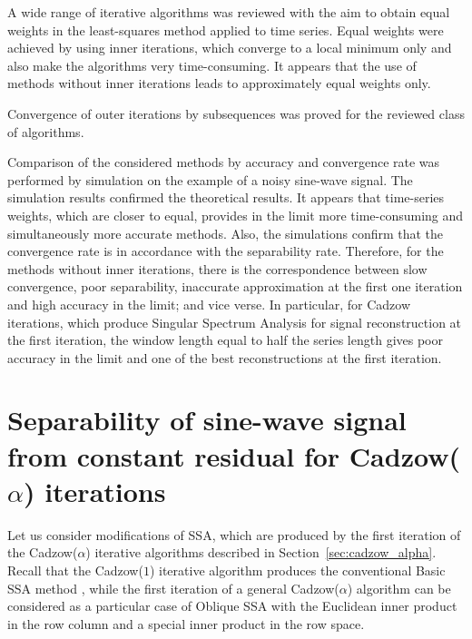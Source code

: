 \documentclass[sii]{ipart}
\begin{document}
A wide range of iterative algorithms was reviewed with the aim to obtain equal weights in the least-squares method applied to time series.
Equal weights were achieved by using inner iterations, which converge to a local minimum only and also make the algorithms very time-consuming. It appears that the use of methods without inner iterations leads to approximately equal weights only.

Convergence of outer iterations by subsequences was proved for the reviewed class of algorithms.

Comparison of the considered methods by accuracy and convergence rate was performed by simulation on the example of a noisy sine-wave signal. The simulation results confirmed the theoretical results. It appears that time-series weights, which are closer to equal, provides in the limit more time-consuming and simultaneously more accurate methods.
Also, the simulations confirm that the convergence rate is in accordance with the separability rate. Therefore, for the methods without inner iterations,
there is the correspondence between slow convergence, poor separability,
inaccurate approximation at the first one iteration and high accuracy in the limit; and vice verse.
In particular, for Cadzow iterations, which produce Singular Spectrum Analysis for signal reconstruction at the first iteration, the window length equal to half the series length gives poor accuracy in the limit and
one of the best reconstructions at the first iteration.


\appendix

\section{Separability of sine-wave signal from constant residual for Cadzow($\alpha$) iterations}
\label{sec:app}

Let us consider modifications of SSA, which are produced by the first iteration of the Cadzow($\alpha$) iterative algorithms described in Section~\ref{sec:cadzow_alpha}. Recall that the Cadzow($1$) iterative algorithm produces the conventional Basic SSA method \cite{Golyandina.etal2001,Golyandina.Zhigljavsky2012}, while the first iteration of a general Cadzow($\alpha$) algorithm can be considered as a
particular case of Oblique SSA \cite{Golyandina2013} with the Euclidean inner product in the row column and a special inner product in the row space.
\end{document}
